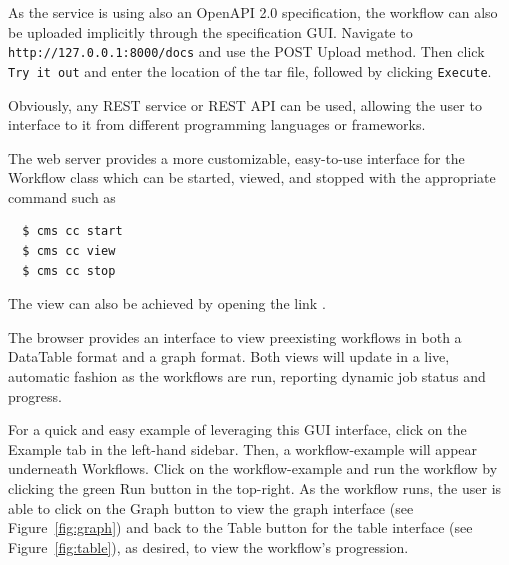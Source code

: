 As the service is using also an OpenAPI 2.0 specification, the
workflow can also be uploaded implicitly through the specification
GUI. Navigate to {\scriptsize \texttt{http://127.0.0.1:8000/docs}} and
use the POST Upload method. Then click {\scriptsize \texttt{Try\ it\ out}}
and enter the location of the tar file, followed by clicking
{\scriptsize \texttt{Execute}}.

Obviously, any REST service or REST API can be used, allowing the user
to interface to it from different programming languages or frameworks.

The web server provides a more customizable, easy-to-use interface for
the Workflow class which can be started, viewed, and stopped with the
appropriate command such as

{\scriptsize
\begin{verbatim}
  $ cms cc start
  $ cms cc view
  $ cms cc stop
\end{verbatim}}

The view can also be achieved by opening the 
link .

The browser provides an interface to view preexisting workflows in
both a DataTable format and a graph format. Both views will update
in a live, automatic fashion as the workflows are run, reporting
dynamic job status and progress.

For a quick and easy example of leveraging this GUI interface, click
on the Example tab in the left-hand sidebar. Then, a workflow-example
will appear underneath Workflows. Click on the workflow-example and
run the workflow by clicking the green Run button in the top-right. As
the workflow runs, the user is able to click on the Graph button to
view the graph interface (see Figure~\ref{fig:graph}) and back to the
Table button for the table interface (see Figure~\ref{fig:table}), as
desired, to view the workflow's progression.
